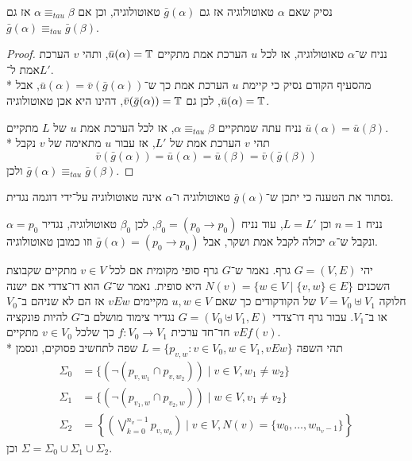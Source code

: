 \Subquestion{}
נסיק שאם $\alpha$ טאוטולוגיה אז גם $\bar{g}(\alpha)$ טאוטולוגיה, וכן אם $\alpha \equiv_{tau} \beta$ אז גם $\bar{g}(\alpha) \equiv_{tau} \bar{g}(\beta)$.
\begin{proof}
	נניח ש־$\alpha$ טאוטולוגיה, אז לכל $u$ הערכת אמת מתקיים $\bar{u}(\alpha) = \mathbb{T}$, ותהי $v$ הערכת אמת ל־$L'$. \\*
	מהסעיף הקודם נסיק כי קיימת $u$ הערכת אמת כך ש־$\bar{u}(\alpha) = \bar{v}(\bar{g}(\alpha))$, אבל $\bar{u}(\alpha) = \mathbb{T}$, לכן גם $\bar{v}(\bar{g}(\alpha)) = \mathbb{T}$, דהינו היא אכן טאוטולוגיה.

	נניח עתה שמתקיים $\alpha \equiv_{tau} \beta$, אז לכל הערכת אמת $u$ של $L$ מתקיים $\bar{u}(\alpha) = \bar{u}(\beta)$. \\*
	תהי $v$ הערכת אמת של $L'$, אז עבור $u$ מתאימה של $v$ נקבל
	\[
		\bar{v}(\bar{g}(\alpha)) = \bar{u}(\alpha) = \bar{u}(\beta) = \bar{v}(\bar{g}(\beta))
	\]
	ולכן $\bar{g}(\alpha) \equiv_{tau} \bar{g}(\beta)$.
\end{proof}

\Subquestion{}
נסתור את הטענה כי יתכן ש־$\bar{g}(\alpha)$ טאוטולוגיה ו־$\alpha$ אינה טאוטולוגיה על־ידי דוגמה נגדית.
\begin{solution}
	נניח $n = 1$ וכן $L = L'$, עוד נניח $\beta_0 = (p_0 \to p_0)$, לכן $\beta_0$ טאוטולוגיה, נגדיר $\alpha = p_0$ ונקבל ש־$\alpha$ יכולה לקבל אמת ושקר, אבל $\bar{g}(\alpha) = (p_0 \to p_0)$ וזו כמובן טאוטולוגיה.
\end{solution}

\Question{}
יהי $G = (V, E)$ גרף. נאמר ש־$G$ גרף סופי מקומית אם לכל $v \in V$ מתקיים שקבוצת השכנים $N(v) = \{ w \in V \mid \{ v, w \} \in E \}$ היא סופית.
נאמר ש־$G$ הוא דו־צדדי אם ישנה חלוקה $V = V_0 \uplus V_1$ של הקודקודים כך שאם $u, w \in V$ מקיימים $vEw$ אז הם לא שניהם ב־$V_0$ או ב־$V_1$.
עבור גרף דו־צדדי $G = (V_0 \uplus V_1, E)$ נגדיר צימוד מושלם ב־$G$ להיות פונקציה חד־חד ערכית $f : V_0 \to V_1$ כך שלכל $v \in V_0$ מתקיים $vEf(v)$. \\*
תהי השפה $L = \{ p_{v, w} : v \in V_0, w \in V_1, vEw \}$ שפה לתחשיב פסוקים, ונסמן
\begin{align*}
	\Sigma_0 & = \{ (\lnot (p_{v, w_1} \cap  p_{v, w_2}) ) \mid v \in V, w_1 \ne w_2 \} \\
	\Sigma_1 & = \{ (\lnot (p_{v_1, w} \cap  p_{v_2, w}) ) \mid w \in V, v_1 \ne v_2 \} \\
	\Sigma_2 & = \left\{ \left( \bigvee_{k = 0}^{n_v - 1} p_{v, w_k} \right) \mid v \in V, N(v) = \{ w_0, \dots, w_{n_v - 1} \} \right\}
\end{align*}
וכן $\Sigma = \Sigma_0 \cup \Sigma_1 \cup \Sigma_2$.

